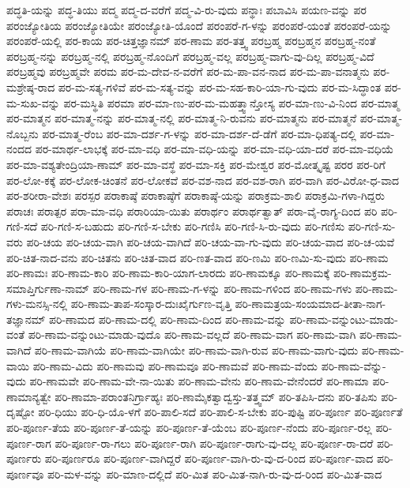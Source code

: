 {ಪದ್ಧತಿ-ಯನ್ನು
ಪದ್ಧ-ತಿಯು
ಪದ್ಮ
ಪದ್ಮ-ದ-ವರೆಗೆ
ಪದ್ಮ-ವಿ-ರು-ವುದು
ಪನ್ಥಾಃ
ಪಬಾವಿಸಿ
ಪಯಣ-ವನ್ನು
ಪರ
ಪರಂಜ್ಯೋತಿಯ
ಪರಂಜ್ಯೋತಿಯೇ
ಪರಂಜ್ಯೋತಿ-ಯೊಂದೆ
ಪರಂಪರೆ-ಗ-ಳನ್ನು
ಪರಂಪರೆ-ಯಂತೆ
ಪರಂಪರೆ-ಯನ್ನು
ಪರಂಪರೆ-ಯಲ್ಲಿ
ಪರ-ಕಾಯ
ಪರ-ಚಿತ್ತಜ್ಞಾನಮ್
ಪರ-ಣಾಮ
ಪರ-ತತ್ತ್ವ
ಪರಬ್ರಹ್ಮ
ಪರಬ್ರಹ್ಮನ
ಪರಬ್ರಹ್ಮ-ನಂತೆ
ಪರಬ್ರಹ್ಮ-ನನ್ನು
ಪರಬ್ರಹ್ಮ-ನಲ್ಲಿ
ಪರಬ್ರಹ್ಮ-ನೊಂದಿಗೆ
ಪರಬ್ರಹ್ಮ-ವಲ್ಲ
ಪರಬ್ರಹ್ಮ-ವಾಗು-ವು-ದಿಲ್ಲ
ಪರಬ್ರಹ್ಮ-ವಿದೆ
ಪರಬ್ರಹ್ಮವು
ಪರಬ್ರಹ್ಮವೇ
ಪರಮ
ಪರ-ಮ-ದೇವ-ನ-ವರೆಗೆ
ಪರ-ಮ-ಪಾ-ವನ-ನಾದ
ಪರ-ಮ-ಪಾ-ವನಾತ್ಮನು
ಪರ-ಮಶ್ರೇಷ್ಠ-ರಾದ
ಪರ-ಮ-ಸತ್ಯ-ಗಳಿವೆ
ಪರ-ಮ-ಸತ್ಯ-ವನ್ನು
ಪರ-ಮ-ಸಹ-ಕಾರಿ-ಯಾ-ಗು-ವುದು
ಪರ-ಮ-ಸಿದ್ಧಾಂತ
ಪರ-ಮ-ಸುಖ-ವನ್ನು
ಪರ-ಮಸ್ಥಿತಿ
ಪರಮಾ
ಪರ-ಮಾ-ಣು-ಪರ-ಮ-ಮಹತ್ತ್ವಾನ್ತೋಸ್ಯ
ಪರ-ಮಾ-ಣು-ವಿ-ನಿಂದ
ಪರ-ಮಾತ್ಮ
ಪರ-ಮಾತ್ಮನ
ಪರ-ಮಾತ್ಮ-ನನ್ನು
ಪರ-ಮಾತ್ಮ-ನಲ್ಲಿ
ಪರ-ಮಾತ್ಮ-ನಿ-ರುವನು
ಪರ-ಮಾತ್ಮನು
ಪರ-ಮಾತ್ಮನೆ
ಪರ-ಮಾತ್ಮ-ನೊಬ್ಬನು
ಪರ-ಮಾತ್ಮ-ರೆಂಬ
ಪರ-ಮಾ-ದರ್ಶ-ಗ-ಳನ್ನು
ಪರ-ಮಾ-ದರ್ಶ-ದೆ-ಡೆಗೆ
ಪರ-ಮಾ-ಧಿಪತ್ಯ-ದಲ್ಲಿ
ಪರ-ಮಾ-ನಂದದ
ಪರ-ಮಾರ್ಥ-ಲಾಭಕ್ಕೆ
ಪರ-ಮಾ-ವಧಿ
ಪರ-ಮಾ-ವಧಿ-ಯನ್ನು
ಪರ-ಮಾ-ವಧಿ-ಯಾ-ದರೆ
ಪರ-ಮಾ-ವಧಿಯೆ
ಪರ-ಮಾ-ವಶ್ಯತೇಂದ್ರಿಯಾ-ಣಾಮ್
ಪರ-ಮಾ-ವಸ್ಥೆ
ಪರ-ಮಾ-ಸಕ್ತಿ
ಪರ-ಮೇಶ್ವರ
ಪರ-ಮೋತ್ಕೃಷ್ಟ
ಪರರ
ಪರ-ರಿಗೆ
ಪರ-ಲೋ-ಕಕ್ಕೆ
ಪರ-ಲೋಕ-ಚಿಂತನೆ
ಪರ-ಲೋಕವೆ
ಪರ-ವಶ-ನಾದ
ಪರ-ವಶ-ರಾಗಿ
ಪರ-ವಾಗಿ
ಪರ-ವಿರೋ-ಧ-ವಾದ
ಪರ-ಶರೀರಾ-ವೇಶಃ
ಪರಸ್ಪರ
ಪರಾಕಾಷ್ಠೆ
ಪರಾಕಾಷ್ಠೆಗೆ
ಪರಾಕಾಷ್ಠೆ-ಯನ್ನು
ಪರಾಕ್ರಮ-ಶಾಲಿ
ಪರಾಕ್ರಮಿ-ಗಳಾ-ಗಿದ್ದರು
ಪರಾಚಃ
ಪರಾತ್ಪರ
ಪರಾ-ಮಾ-ವಧಿ
ಪರಾರಿಯಾ-ಯಿತು
ಪರಾರ್ಥಂ
ಪರಾರ್ಥತ್ವಾತ್
ಪರಾ-ವೈ-ರಾಗ್ಯ-ದಿಂದ
ಪರಿ
ಪರಿ-ಗಣಿ-ಸದೆ
ಪರಿ-ಗಣಿ-ಸ-ಬಹುದು
ಪರಿ-ಗಣಿ-ಸ-ಬೇಕು
ಪರಿ-ಗಣಿಸಿ
ಪರಿ-ಗಣಿ-ಸಿ-ರು-ವುದು
ಪರಿ-ಗಣಿಸು
ಪರಿ-ಗಣಿ-ಸು-ವರು
ಪರಿ-ಚಯ
ಪರಿ-ಚಯ-ವಾಗಿ
ಪರಿ-ಚಯ-ವಾಗಿದೆ
ಪರಿ-ಚಯ-ವಾ-ಗು-ವುದು
ಪರಿ-ಚಯ-ವಾದ
ಪರಿ-ಚ-ಯವೆ
ಪರಿ-ಚಿತ-ನಾದ-ವನು
ಪರಿ-ಚಿತನು
ಪರಿ-ಚಿತ-ವಾದ
ಪರಿ-ಣತ-ವಾದ
ಪರಿ-ಣಮಿ
ಪರಿ-ಣಮಿ-ಸು-ವುದು
ಪರಿ-ಣಾಮ
ಪರಿ-ಣಾಮಃ
ಪರಿ-ಣಾಮ-ಕಾರಿ
ಪರಿ-ಣಾಮ-ಕಾರಿ-ಯಾಗ-ಲಾರದು
ಪರಿ-ಣಾಮಕ್ಕೂ
ಪರಿ-ಣಾಮಕ್ಕೆ
ಪರಿ-ಣಾಮಕ್ರಮ-ಸಮಾಪ್ತಿರ್ಗುಣಾ-ನಾಮ್
ಪರಿ-ಣಾಮ-ಗಳ
ಪರಿ-ಣಾಮ-ಗ-ಳನ್ನು
ಪರಿ-ಣಾಮ-ಗಳಿಂದ
ಪರಿ-ಣಾಮ-ಗಳು
ಪರಿ-ಣಾಮ-ಗಳು-ಮನಸ್ಸಿ-ನಲ್ಲಿ
ಪರಿ-ಣಾಮ-ತಾಪ-ಸಂಸ್ಕಾರ-ದುಃಖೈರ್ಗುಣ-ವೃತ್ತಿ
ಪರಿ-ಣಾಮತ್ರಯ-ಸಂಯಮಾದ-ತೀತಾ-ನಾಗ-ತಜ್ಞಾನಮ್
ಪರಿ-ಣಾಮದ
ಪರಿ-ಣಾಮ-ದಲ್ಲಿ
ಪರಿ-ಣಾಮ-ದಿಂದ
ಪರಿ-ಣಾಮ-ವನ್ನು
ಪರಿ-ಣಾಮ-ವನ್ನುಂಟು-ಮಾಡು-ವಂತೆ
ಪರಿ-ಣಾಮ-ವನ್ನುಂಟು-ಮಾಡು-ವುದೊ
ಪರಿ-ಣಾಮ-ವಲ್ಲದೆ
ಪರಿ-ಣಾಮ-ವಾಗ
ಪರಿ-ಣಾಮ-ವಾಗಿ
ಪರಿ-ಣಾಮ-ವಾಗಿದೆ
ಪರಿ-ಣಾಮ-ವಾಗಿಯೆ
ಪರಿ-ಣಾಮ-ವಾಗಿಯೇ
ಪರಿ-ಣಾಮ-ವಾಗಿ-ರುವ
ಪರಿ-ಣಾಮ-ವಾಗು-ವುದು
ಪರಿ-ಣಾಮ-ವಾಯಿ
ಪರಿ-ಣಾಮ-ವಿದು
ಪರಿ-ಣಾಮವು
ಪರಿ-ಣಾಮವೂ
ಪರಿ-ಣಾಮವೆ
ಪರಿ-ಣಾಮ-ವೆಂದು
ಪರಿ-ಣಾಮ-ವೆನ್ನು-ವುದು
ಪರಿ-ಣಾಮವೇ
ಪರಿ-ಣಾಮ-ವೇ-ನಾ-ಯಿತು
ಪರಿ-ಣಾಮ-ವೇನು
ಪರಿ-ಣಾಮ-ವೇನೆಂದರೆ
ಪರಿ-ಣಾಮಾ
ಪರಿ-ಣಾಮಾನ್ಯತ್ವೇ
ಪರಿ-ಣಾಮಾ-ಪರಾಂತನಿರ್ಗ್ರಾಹ್ಯಃ
ಪರಿ-ಣಾಮೈಕತ್ವಾದ್ವಸ್ತು-ತತ್ತ್ವಮ್
ಪರಿ-ತಪಿಸಿ-ದನು
ಪರಿ-ತಪಿಸು
ಪರಿ-ದೃಷ್ಟೋ
ಪರಿ-ಧಿಯು
ಪರಿ-ಧಿ-ಯೊ-ಳಗೆ
ಪರಿ-ಪಾಲಿ-ಸದೆ
ಪರಿ-ಪಾಲಿ-ಸ-ಬೇಕು
ಪರಿ-ಪುಷ್ಟಿ
ಪರಿ-ಪೂರ್ಣ
ಪರಿ-ಪೂರ್ಣತೆ
ಪರಿ-ಪೂರ್ಣ-ತೆಯ
ಪರಿ-ಪೂರ್ಣ-ತೆ-ಯನ್ನು
ಪರಿ-ಪೂರ್ಣ-ತೆ-ಯೆಂಬ
ಪರಿ-ಪೂರ್ಣ-ನೆಂದು
ಪರಿ-ಪೂರ್ಣ-ರಲ್ಲ
ಪರಿ-ಪೂರ್ಣ-ರಾಗ
ಪರಿ-ಪೂರ್ಣ-ರಾ-ಗಲು
ಪರಿ-ಪೂರ್ಣ-ರಾಗಿ
ಪರಿ-ಪೂರ್ಣ-ರಾಗು-ವು-ದಲ್ಲ
ಪರಿ-ಪೂರ್ಣ-ರಾ-ದರೆ
ಪರಿ-ಪೂರ್ಣರು
ಪರಿ-ಪೂರ್ಣರೂ
ಪರಿ-ಪೂರ್ಣ-ವಾಗಿದ್ದರೆ
ಪರಿ-ಪೂರ್ಣ-ವಾಗಿ-ರು-ವು-ದ-ರಿಂದ
ಪರಿ-ಪೂರ್ಣ-ವಾದ
ಪರಿ-ಪೂರ್ಣವೂ
ಪರಿ-ಮಳ-ವನ್ನು
ಪರಿ-ಮಾಣ-ದಲ್ಲಿದೆ
ಪರಿ-ಮಿತ
ಪರಿ-ಮಿತ-ನಾಗಿ-ರು-ವು-ದ-ರಿಂದ
ಪರಿ-ಮಿತ-ವಾದ
}
